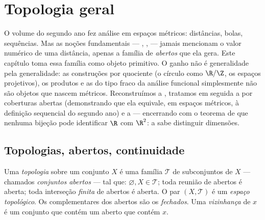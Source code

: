 \chapter{Topologia geral}\label{ch:b3:topology}

O volume do segundo ano fez análise em espaços métricos: distâncias,
bolas, sequências. Mas as noções fundamentais --- ,
,  --- jamais mencionam o valor numérico de uma
distância, apenas a família de \emph{abertos} que ela gera. Este
capítulo toma essa família como objeto primitivo. O ganho não é
generalidade pela generalidade: as construções por quociente (o círculo
como $\R/\Z$, os espaços projetivos), os produtos e as  do
tipo fraco da análise funcional simplesmente não são objetos que nascem
métricos. Reconstruímos a , tratamos em seguida a
 por coberturas abertas (demonstrando que ela equivale, em
espaços métricos, à definição sequencial do segundo ano) e a 
--- encerrando com o teorema de que nenhuma bijeção  pode
identificar $\R$ com $\R^2$: a  sabe distinguir dimensões.

\section{Topologias, abertos, continuidade}

\begin{definition}\label{def:b3:topology:topology}
Uma \emph{topologia} sobre um conjunto $X$ é uma
família $\mathcal T$ de subconjuntos de $X$ --- chamados \emph{conjuntos
abertos} --- tal que: $\varnothing, X \in
\mathcal T$; toda reunião de
abertos é aberta; toda interseção \emph{finita} de abertos é aberta. O
par $(X, \mathcal T)$ é um \emph{espaço topológico}. Os complementares dos abertos
são os \emph{fechados}. Uma \emph{vizinhança} de
$x$ é um conjunto que contém um aberto que contém $x$.
\end{definition}

